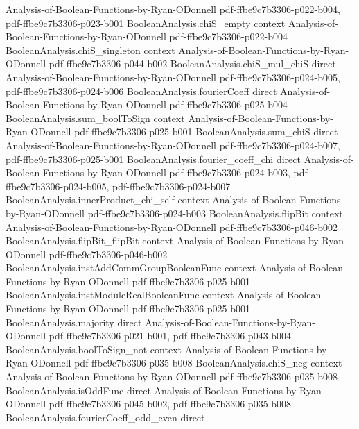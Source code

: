 \begin{theorem}
  {Analysis-of-Boolean-Functions-by-Ryan-ODonnell}
  {pdf-ffbe9c7b3306-p022-b004,
    pdf-ffbe9c7b3306-p023-b001}
\proofstep
  {BooleanAnalysis.chiS_empty}
  {context}
  {Analysis-of-Boolean-Functions-by-Ryan-ODonnell}
  {pdf-ffbe9c7b3306-p022-b004}
\proofstep
  {BooleanAnalysis.chiS_singleton}
  {context}
  {Analysis-of-Boolean-Functions-by-Ryan-ODonnell}
  {pdf-ffbe9c7b3306-p044-b002}
\proofstep
  {BooleanAnalysis.chiS_mul_chiS}
  {direct}
  {Analysis-of-Boolean-Functions-by-Ryan-ODonnell}
  {pdf-ffbe9c7b3306-p024-b005,
    pdf-ffbe9c7b3306-p024-b006}
\proofstep
  {BooleanAnalysis.fourierCoeff}
  {direct}
  {Analysis-of-Boolean-Functions-by-Ryan-ODonnell}
  {pdf-ffbe9c7b3306-p025-b004}
\proofstep
  {BooleanAnalysis.sum_boolToSign}
  {context}
  {Analysis-of-Boolean-Functions-by-Ryan-ODonnell}
  {pdf-ffbe9c7b3306-p025-b001}
\proofstep
  {BooleanAnalysis.sum_chiS}
  {direct}
  {Analysis-of-Boolean-Functions-by-Ryan-ODonnell}
  {pdf-ffbe9c7b3306-p024-b007,
    pdf-ffbe9c7b3306-p025-b001}
\proofstep
  {BooleanAnalysis.fourier_coeff_chi}
  {direct}
  {Analysis-of-Boolean-Functions-by-Ryan-ODonnell}
  {pdf-ffbe9c7b3306-p024-b003,
    pdf-ffbe9c7b3306-p024-b005,
    pdf-ffbe9c7b3306-p024-b007}
\proofstep
  {BooleanAnalysis.innerProduct_chi_self}
  {context}
  {Analysis-of-Boolean-Functions-by-Ryan-ODonnell}
  {pdf-ffbe9c7b3306-p024-b003}
\proofstep
  {BooleanAnalysis.flipBit}
  {context}
  {Analysis-of-Boolean-Functions-by-Ryan-ODonnell}
  {pdf-ffbe9c7b3306-p046-b002}
\proofstep
  {BooleanAnalysis.flipBit_flipBit}
  {context}
  {Analysis-of-Boolean-Functions-by-Ryan-ODonnell}
  {pdf-ffbe9c7b3306-p046-b002}
\proofstep
  {BooleanAnalysis.instAddCommGroupBooleanFunc}
  {context}
  {Analysis-of-Boolean-Functions-by-Ryan-ODonnell}
  {pdf-ffbe9c7b3306-p025-b001}
\proofstep
  {BooleanAnalysis.instModuleRealBooleanFunc}
  {context}
  {Analysis-of-Boolean-Functions-by-Ryan-ODonnell}
  {pdf-ffbe9c7b3306-p025-b001}
\proofstep
  {BooleanAnalysis.majority}
  {direct}
  {Analysis-of-Boolean-Functions-by-Ryan-ODonnell}
  {pdf-ffbe9c7b3306-p021-b001,
    pdf-ffbe9c7b3306-p043-b004}
\proofstep
  {BooleanAnalysis.boolToSign_not}
  {context}
  {Analysis-of-Boolean-Functions-by-Ryan-ODonnell}
  {pdf-ffbe9c7b3306-p035-b008}
\proofstep
  {BooleanAnalysis.chiS_neg}
  {context}
  {Analysis-of-Boolean-Functions-by-Ryan-ODonnell}
  {pdf-ffbe9c7b3306-p035-b008}
\proofstep
  {BooleanAnalysis.isOddFunc}
  {direct}
  {Analysis-of-Boolean-Functions-by-Ryan-ODonnell}
  {pdf-ffbe9c7b3306-p045-b002,
    pdf-ffbe9c7b3306-p035-b008}
\proofstep
  {BooleanAnalysis.fourierCoeff_odd_even}
  {direct}

\end{theorem}
